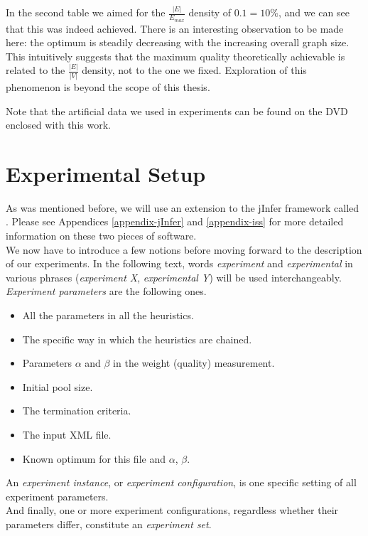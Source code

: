 In the second table we aimed for the $\frac{|E|}{E_{max}}$ density of $0.1 = 10\%$, and we can see that this was indeed achieved. There is an interesting observation to be made here: the optimum is steadily decreasing with the increasing overall graph size. This intuitively suggests that the maximum quality theoretically achievable is related to the $\frac{|E|}{|V|}$ density, not to the one we fixed. Exploration of this phenomenon is beyond the scope of this thesis.

Note that the artificial data we used in experiments can be found on the DVD enclosed with this work.

\section{Experimental Setup}

As was mentioned before, we will use an extension to the jInfer framework called . Please see Appendices \ref{appendix-jInfer} and \ref{appendix-iss} for more detailed information on these two pieces of software.\\

We now have to introduce a few notions before moving forward to the description of our experiments. In the following text, words \textit{experiment} and \textit{experimental} in various phrases (\textit{experiment X}, \textit{experimental Y}) will be used interchangeably.\\

\textit{Experiment parameters} are the following ones.
\begin{itemize}
	\item All the parameters in all the heuristics.
	\item The specific way in which the heuristics are chained.
	\item Parameters $\alpha$ and $\beta$ in the weight (quality) measurement.
	\item Initial pool size.
	\item The termination criteria.
	\item The input XML file.
	\item Known optimum for this file and $\alpha$, $\beta$.
\end{itemize}

An \textit{experiment instance}, or \textit{experiment configuration}, is one specific setting of all experiment parameters.\\

And finally, one or more experiment configurations, regardless whether their parameters differ, constitute an \textit{experiment set}.


